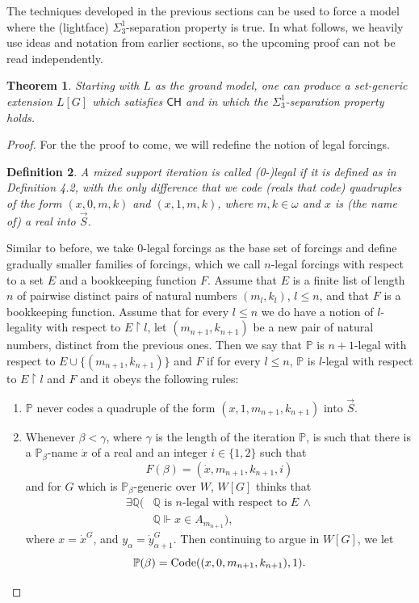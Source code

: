 \documentclass[a4paper,11pt]{article}
\newtheorem{theorem}{Theorem}[section]
\newtheorem{definition}[theorem]{Definition}
\newcommand{\forceP}{\mathbb{P}}
\newcommand{\forceQ}{\mathbb{Q}}
\newcommand{\CH}{\mathsf{CH}}
\begin{document}
The techniques developed in the previous sections can be used to force a model where the (lightface) $\Sigma^1_3$-separation property is true. In what follows, we heavily use ideas and notation from earlier sections, so the upcoming proof can not be read independently.

\begin{theorem}
Starting with $L$ as the ground model, one can produce a set-generic extension $L[G]$ which satisfies $\CH$ and in which the ${\Sigma^1_3}$-separation property holds.
\end{theorem}

\begin{proof}


For the the proof to come, we will redefine the notion of legal forcings.
\begin{definition}
A mixed support iteration is called (0-)legal if it is defined as in Definition 4.2, with the only difference that we code (reals that code) quadruples of the form $(x,0,m,k)$ and $(x,1,m,k)$, where $m,k \in \omega$ and $x$ is (the name of) a real into $\vec{S}$.
\end{definition}
Similar to before, we take 0-legal forcings as the base set of forcings and define gradually smaller families of forcings, which we call $n$-legal forcings with respect to a set $E$ and a bookkeeping function $F$.
Assume that $E$ is a finite list of length $n$ of pairwise distinct pairs of natural numbers $(m_l, k_l)$, $l \le n$,
and that $F$ is a bookkeeping function.
Assume that for every $l \le n$ we do have a notion of $l$-legality with respect to $E \upharpoonright l$, let $(m_{n+1}, k_{n+1})$ be a new pair of natural numbers, distinct from the previous ones. Then we say that $\forceP$ is $n+1$-legal with respect to $E \cup \{ (m_{n+1}, k_{n+1} ) \}$ and $F$ if for every $l \le n$, $\forceP $ is $l$-legal with respect to $E \upharpoonright l$ and $F$ and it obeys the following rules:
\begin{enumerate}
\item $\forceP$ never codes a quadruple of the form $(x,1,m_{n+1},k_{n+1})$ into $\vec{S}$.
\item Whenever $\beta < \gamma $, where $\gamma$ is the length of the iteration $\forceP$, is such that there is a $\forceP_{\beta}$-name $\dot{x}$ of a real and an integer $ i\in\{1,2\}$ such that
\[F(\beta)= (\dot{x},m_{n+1},k_{n+1},i)\] and for  $G$ which is $\forceP_{\beta}$-generic over $W$, $W[G]$ thinks that
\begin{align*}
\exists \forceQ (&\forceQ \text{ is } n \text{-legal with respect to } E \,  \land \\&   \forceQ \Vdash x \in A_{m_{n+1}}),
\end{align*}
where $x=\dot{x}^G$, and $y_{\alpha}=\dot{y}_{\alpha+1}^G$.
Then continuing to argue in $W[G]$, we let
\[\forceP(\beta)= \hbox{Code}((x,0,m_{n+1},k_{n+1}),1).\] 


\end{enumerate}
\end{proof}
\end{document}
